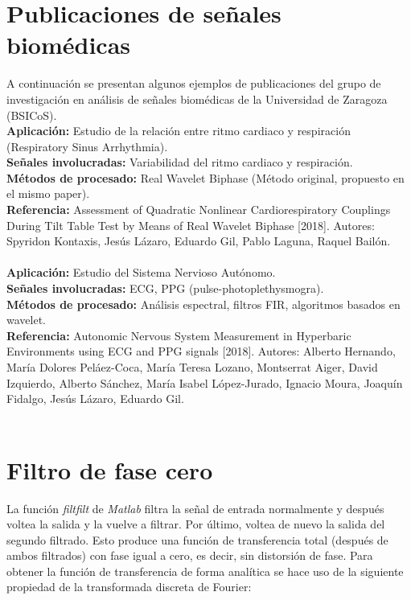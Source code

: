 \documentclass[12pt]{article}
\begin{document}
\pagebreak


\section{Publicaciones de señales biomédicas}
A continuación se presentan algunos ejemplos de publicaciones del grupo de investigación en análisis de señales biomédicas de la Universidad de Zaragoza (BSICoS).\\

\textbf{Aplicación:} Estudio de la relación entre ritmo cardiaco y respiración (Respiratory Sinus Arrhythmia).\\
\textbf{Señales involucradas:} Variabilidad del ritmo cardiaco y respiración.\\
\textbf{Métodos de procesado:} Real Wavelet Biphase (Método original, propuesto en el mismo paper).\\
\textbf{Referencia:} Assessment of Quadratic Nonlinear
Cardiorespiratory Couplings During Tilt Table Test
by Means of Real Wavelet Biphase [2018]. Autores: Spyridon Kontaxis, Jesús Lázaro, Eduardo Gil, Pablo Laguna, Raquel Bailón.\\\\

\textbf{Aplicación:} Estudio del Sistema Nervioso Autónomo.\\
\textbf{Señales involucradas:} ECG, PPG (pulse-photoplethysmogra).\\
\textbf{Métodos de procesado:} Análisis espectral, filtros FIR, algoritmos basados en wavelet.\\
\textbf{Referencia:} Autonomic Nervous System Measurement in
Hyperbaric Environments using ECG and PPG signals [2018]. Autores: Alberto Hernando, María Dolores Peláez-Coca, María Teresa Lozano, Montserrat Aiger, David Izquierdo, Alberto
Sánchez, María Isabel López-Jurado, Ignacio Moura, Joaquín Fidalgo, Jesús Lázaro, Eduardo Gil.\\\\

\section{Filtro de fase cero}
La función \textit{filtfilt} de \textit{Matlab} filtra la señal de entrada normalmente y después voltea la salida y la vuelve a filtrar. Por último, voltea de nuevo la salida del segundo filtrado. Esto produce una función de transferencia total (después de ambos filtrados) con fase igual a cero, es decir, sin distorsión de fase. Para obtener la función de transferencia de forma analítica se hace uso de la siguiente propiedad de la transformada discreta de Fourier:
\end{document}
